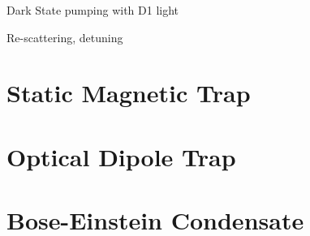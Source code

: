 Dark State pumping with D1 light

Re-scattering, detuning

\section{Static Magnetic Trap}

\section{Optical Dipole Trap}

\section{Bose-Einstein Condensate}
